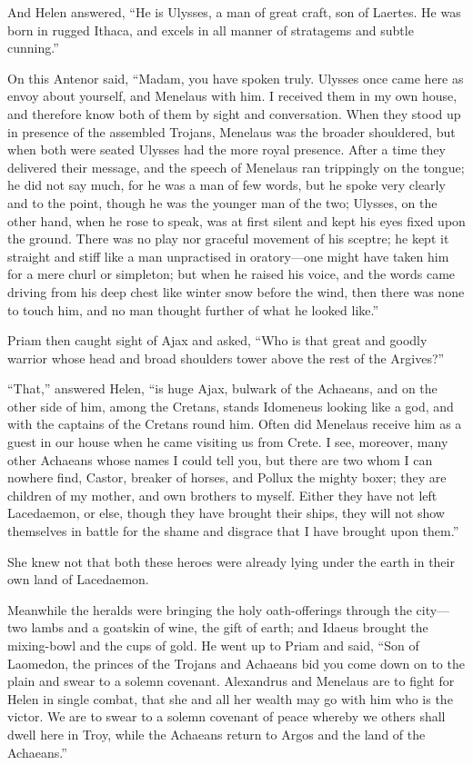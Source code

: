 And Helen answered, “He is Ulysses, a man of great craft, son of Laertes.
He was born in rugged Ithaca, and excels in all manner of stratagems and
subtle cunning.”

On this Antenor said, “Madam, you have spoken truly. Ulysses once came
here as envoy about yourself, and Menelaus with him. I received them in my
own house, and therefore know both of them by sight and conversation. When
they stood up in presence of the assembled Trojans, Menelaus was the
broader shouldered, but when both were seated Ulysses had the more royal
presence. After a time they delivered their message, and the speech of
Menelaus ran trippingly on the tongue; he did not say much, for he was a
man of few words, but he spoke very clearly and to the point, though he
was the younger man of the two; Ulysses, on the other hand, when he rose
to speak, was at first silent and kept his eyes fixed upon the ground.
There was no play nor graceful movement of his sceptre; he kept it
straight and stiff like a man unpractised in oratory—one might have
taken him for a mere churl or simpleton; but when he raised his voice, and
the words came driving from his deep chest like winter snow before the
wind, then there was none to touch him, and no man thought further of what
he looked like.”

Priam then caught sight of Ajax and asked, “Who is that great and goodly
warrior whose head and broad shoulders tower above the rest of the
Argives?”

“That,” answered Helen, “is huge Ajax, bulwark of the Achaeans, and on the
other side of him, among the Cretans, stands Idomeneus looking like a god,
and with the captains of the Cretans round him. Often did Menelaus receive
him as a guest in our house when he came visiting us from Crete. I see,
moreover, many other Achaeans whose names I could tell you, but there are
two whom I can nowhere find, Castor, breaker of horses, and Pollux the
mighty boxer; they are children of my mother, and own brothers to myself.
Either they have not left Lacedaemon, or else, though they have brought
their ships, they will not show themselves in battle for the shame and
disgrace that I have brought upon them.”

She knew not that both these heroes were already lying under the earth in
their own land of Lacedaemon.

Meanwhile the heralds were bringing the holy oath-offerings through the
city—two lambs and a goatskin of wine, the gift of earth; and Idaeus
brought the mixing-bowl and the cups of gold. He went up to Priam and
said, “Son of Laomedon, the princes of the Trojans and Achaeans bid you
come down on to the plain and swear to a solemn covenant. Alexandrus and
Menelaus are to fight for Helen in single combat, that she and all her
wealth may go with him who is the victor. We are to swear to a solemn
covenant of peace whereby we others shall dwell here in Troy, while the
Achaeans return to Argos and the land of the Achaeans.”

